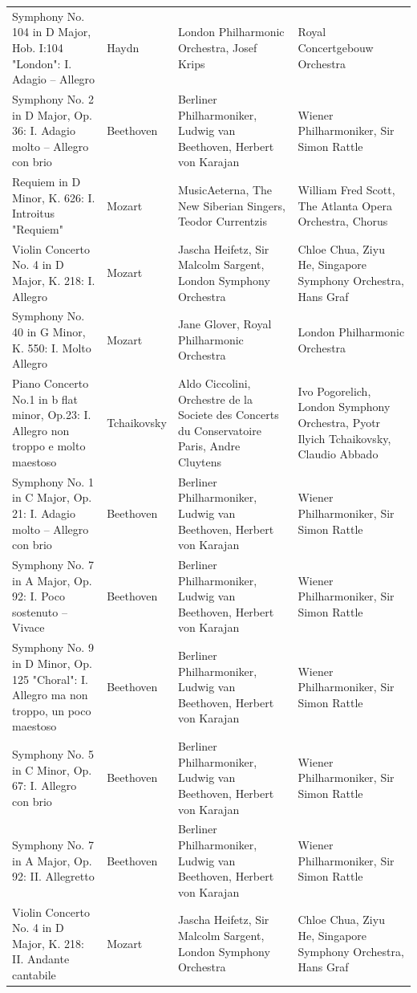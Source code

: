 \begin{longtable}{p{} p{} p{} p{}}
Symphony No. 104 in D Major, Hob. I:104 "London": I. Adagio – Allegro & Haydn & London Philharmonic Orchestra, Josef Krips & Royal Concertgebouw Orchestra \\
Symphony No. 2 in D Major, Op. 36: I. Adagio molto – Allegro con brio & Beethoven & Berliner Philharmoniker, Ludwig van Beethoven, Herbert von Karajan & Wiener Philharmoniker, Sir Simon Rattle \\
Requiem in D Minor, K. 626: I. Introitus "Requiem" & Mozart & MusicAeterna, The New Siberian Singers, Teodor Currentzis & William Fred Scott, The Atlanta Opera Orchestra, Chorus \\
Violin Concerto No. 4 in D Major, K. 218: I. Allegro & Mozart & Jascha Heifetz, Sir Malcolm Sargent, London Symphony Orchestra & Chloe Chua, Ziyu He, Singapore Symphony Orchestra, Hans Graf \\
Symphony No. 40 in G Minor, K. 550: I. Molto Allegro & Mozart & Jane Glover, Royal Philharmonic Orchestra & London Philharmonic Orchestra \\
Piano Concerto No.1 in b flat minor, Op.23: I. Allegro non troppo e molto maestoso & Tchaikovsky & Aldo Ciccolini, Orchestre de la Societe des Concerts du Conservatoire Paris, Andre Cluytens & Ivo Pogorelich, London Symphony Orchestra, Pyotr Ilyich Tchaikovsky, Claudio Abbado \\
Symphony No. 1 in C Major, Op. 21: I. Adagio molto – Allegro con brio & Beethoven & Berliner Philharmoniker, Ludwig van Beethoven, Herbert von Karajan & Wiener Philharmoniker, Sir Simon Rattle \\
Symphony No. 7 in A Major, Op. 92: I. Poco sostenuto – Vivace & Beethoven & Berliner Philharmoniker, Ludwig van Beethoven, Herbert von Karajan & Wiener Philharmoniker, Sir Simon Rattle \\
Symphony No. 9 in D Minor, Op. 125 "Choral": I. Allegro ma non troppo, un poco maestoso & Beethoven & Berliner Philharmoniker, Ludwig van Beethoven, Herbert von Karajan & Wiener Philharmoniker, Sir Simon Rattle \\
Symphony No. 5 in C Minor, Op. 67: I. Allegro con brio & Beethoven & Berliner Philharmoniker, Ludwig van Beethoven, Herbert von Karajan & Wiener Philharmoniker, Sir Simon Rattle \\
Symphony No. 7 in A Major, Op. 92: II. Allegretto & Beethoven & Berliner Philharmoniker, Ludwig van Beethoven, Herbert von Karajan & Wiener Philharmoniker, Sir Simon Rattle \\
Violin Concerto No. 4 in D Major, K. 218: II. Andante cantabile & Mozart & Jascha Heifetz, Sir Malcolm Sargent, London Symphony Orchestra & Chloe Chua, Ziyu He, Singapore Symphony Orchestra, Hans Graf \\

\end{longtable}
